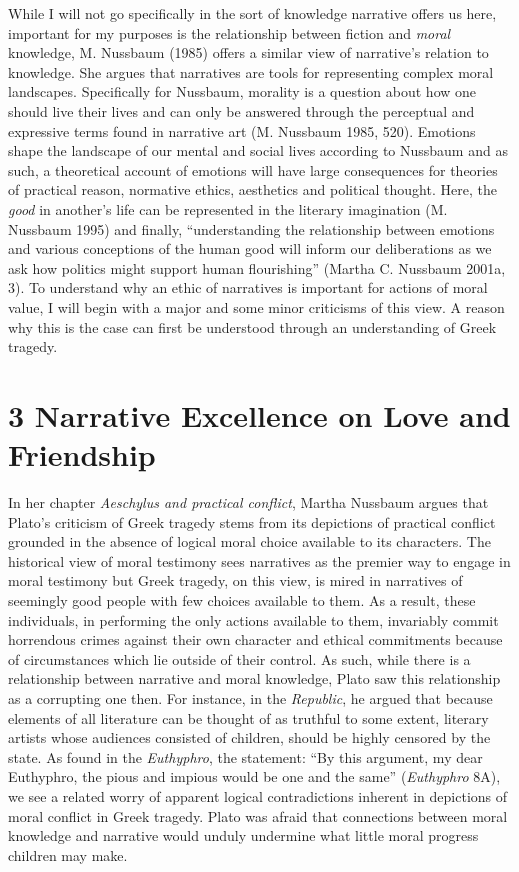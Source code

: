 \documentclass[12pt]{book}
\theoremstyle{definition}
\theoremstyle{remark}
\begin{document}
While I will not go specifically in the sort of knowledge narrative offers us here, important for my purposes is the relationship between fiction and \emph{moral} knowledge, M. Nussbaum (1985) offers a similar view of narrative's relation to knowledge. She argues that narratives are tools for representing complex moral landscapes. Specifically for Nussbaum, morality is a question about how one should live their lives and can only be answered through the perceptual and expressive terms found in narrative art (M. Nussbaum 1985, 520). Emotions shape the landscape of our mental and social lives according to Nussbaum and as such, a theoretical account of emotions will have large consequences for theories of practical reason, normative ethics, aesthetics and political thought. Here, the \emph{good} in another's life can be represented in the literary imagination (M. Nussbaum 1995) and finally, ``understanding the relationship between emotions and various conceptions of the human good will inform our deliberations as we ask how politics might support human flourishing'' (Martha C. Nussbaum 2001a, 3). To understand why an ethic of narratives is important for actions of moral value, I will begin with a major and some minor criticisms of this view. A reason why this is the case can first be understood through an understanding of Greek tragedy.

\section{3 Narrative Excellence on Love and Friendship}\label{narrative-excellence-on-love-and-friendship}

In her chapter \emph{Aeschylus and practical conflict}, Martha Nussbaum argues that Plato's criticism of Greek tragedy stems from its depictions of practical conflict grounded in the absence of logical moral choice available to its characters. The historical view of moral testimony sees narratives as the premier way to engage in moral testimony but Greek tragedy, on this view, is mired in narratives of seemingly good people with few choices available to them. As a result, these individuals, in performing the only actions available to them, invariably commit horrendous crimes against their own character and ethical commitments because of circumstances which lie outside of their control. As such, while there is a relationship between narrative and moral knowledge, Plato saw this relationship as a corrupting one then. For instance, in the \emph{Republic}, he argued that because elements of all literature can be thought of as truthful to some extent, literary artists whose audiences consisted of children, should be highly censored by the state. As found in the \emph{Euthyphro}, the statement: ``By this argument, my dear Euthyphro, the pious and impious would be one and the same'' (\emph{Euthyphro} 8A), we see a related worry of apparent logical contradictions inherent in depictions of moral conflict in Greek tragedy. Plato was afraid that connections between moral knowledge and narrative would unduly undermine what little moral progress children may make.
\end{document}

